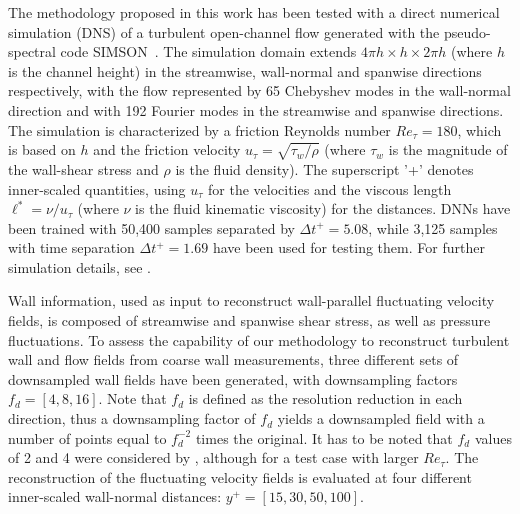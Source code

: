 The methodology proposed in this work has been tested with a direct numerical simulation (DNS) of a turbulent open-channel flow generated with the pseudo-spectral code SIMSON~\citep{chevalier2007pseudo}.
The simulation domain extends $4\pi h \times h \times 2\pi h$ (where $h$ is the channel height) in the streamwise, wall-normal and spanwise directions respectively, with the flow represented by 65 Chebyshev modes in the wall-normal direction and with 192 Fourier modes in the streamwise and spanwise directions.
The simulation is characterized by a friction Reynolds number $Re_{\tau}=180$, which is based on $h$ and the friction velocity $u_{\tau}=\sqrt{\tau_w/\rho}$ (where $\tau_w$ is the magnitude of the wall-shear stress and $\rho$ is the fluid density).
The superscript '+' denotes inner-scaled quantities, using $u_{\tau}$ for the velocities and the viscous length $\ell^*=\nu/u_{\tau}$ (where $\nu$ is the fluid kinematic viscosity) for the distances.
DNNs have been trained with 50,400 samples separated by $\Delta t^+=5.08$, while 3,125 samples with time separation $\Delta t^+=1.69$ have been used for testing them.
For further simulation details, see \citet{guastoni2020convolutional}.

Wall information, used as input to reconstruct wall-parallel fluctuating velocity fields, is composed of streamwise and spanwise shear stress, as well as pressure fluctuations.
To assess the capability of our methodology to reconstruct turbulent wall and flow fields from coarse wall measurements, three different sets of downsampled wall fields have been generated, with downsampling factors $f_d=[4,8,16]$.
Note that $f_d$ is defined as the resolution reduction in each direction, thus a downsampling factor of $f_d$ yields a downsampled field with a number of points equal to $f_d^{-2}$ times the original.
It has to be noted that $f_d$ values of 2 and 4 were considered by \citet{guemes2019sensing}, although for a test case with larger $Re_{\tau}$.
The reconstruction of the fluctuating velocity fields is evaluated at four different inner-scaled wall-normal distances: $y^+=[15,30,50,100]$.

